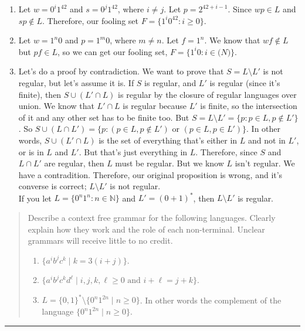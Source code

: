 \documentclass[11pt]{article}
\begin{document}
\begin{solution}
    \begin{enumerate}
        \item Let $w = 0^i1^{42}$ and $s = 0^j1^{42}$, where $i \neq j$. Let $p = 2^{42 + i - 1}$. Since $wp \in L$ and $sp \not\in L$. Therefore, our fooling set $F = \{1^i0^{42} : i \geq 0\}$.
        \item Let $w = 1^n0$ and $p = 1^m0$, where $m \neq n$. Let $f = 1^n$. We know that $wf \not\in L$ but $pf \in L$, so we can get our fooling set, $F = \{1^i0 : i \in \mathbb(N)\}$.
        \item Let's do a proof by contradiction. We want to prove that $S = L \setminus L'$ is not regular, but let's assume it is. If $S$ is regular, and $L'$ is regular (since it's finite), then $S \cup (L' \cap L)$ is regular by the closure of regular languages over union. We know that $L' \cap L$ is regular because $L'$ is finite, so the intersection of it and any other set has to be finite too. But $S = L \setminus L' = \{p : p \in L, p \not\in L'\}$. So $S \cup (L \cap L') = \{p : (p \in L, p \not\in L') \text{ or } (p \in L, p \in L')\}$. In other words, $S \cup (L' \cap L)$ is the set of everything that's either in $L$ and not in $L'$, or is in $L$ and $L'$. But that's just everything in $L$. Therefore, since $S$ and $L \cap L'$ are regular, then $L$ must be regular. But we know $L$ isn't regular. We have a contradition. Therefore, our original proposition is wrong, and it's converse is correct; $L \setminus L'$ is not regular. \\
            If you let $L = \{0^n1^n : n \in \mathbb{N}\}$ and $L' = (0+1)^*$, then $L \setminus L'$ is regular.
    \end{enumerate}
\end{solution}


\begin{quote}
    Describe a context free grammar for the following languages.
    Clearly explain how they work and the role of each non-terminal.
    Unclear grammars will receive little to no credit.
    \begin{enumerate}
        \item $\{a^ib^jc^k \mid k = 3(i+j)\}$.
        \item $\{a^ib^jc^kd^\ell \mid  i,j,k,\ell \ge 0 \mbox{~and~} i+\ell = j+k\}$.
        \item $L = \{0,1\}^* \setminus \{ 0^n1^{2n} \mid n \ge 0\}$. In other words
            the complement of the language $\{ 0^n1^{2n} \mid n \ge 0\}$.
    \end{enumerate}
\end{quote}
\hrule
\end{document}
